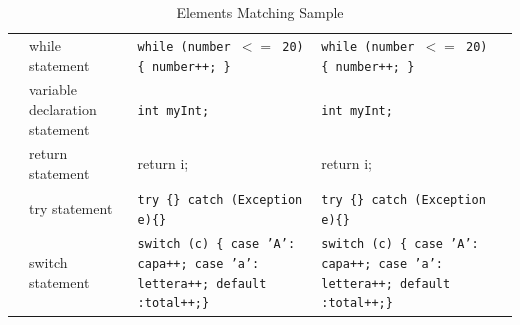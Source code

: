 \begin{table}
{\begin{tabular}{p{2cm}|l|p{5cm}|p{5cm}c}
		& while statement & \texttt{while (number $<=$ 20) \{ number++; \}} & \texttt{while (number $<=$ 20) \{ number++; \}}  \\\cline{2-5}
		
		& variable declaration statement & \texttt{int myInt;} & \texttt{int myInt;} \\\cline{2-5}
		
		& return statement & return i; & return i;  \\\cline{2-5}
		& try statement & \texttt{try \{\} catch (Exception e)\{\}} & \texttt{try \{\} catch (Exception e)\{\}}  \\\cline{2-5}
		
		& switch statement & \texttt{switch (c) \{ case 'A': capa++; case 'a': lettera++; default :total++;\}} & \texttt{switch (c) \{ case 'A': capa++; case 'a': lettera++; default :total++;\}} \\\cline{1-5}
	\end{tabular}}
	\medskip
	\caption{Elements Matching Sample}
\end{table}


\begin{table}
	
	\label{tab:freq}
	\medskip
	\caption{MRR score of Expression matching}	
\end{table}


